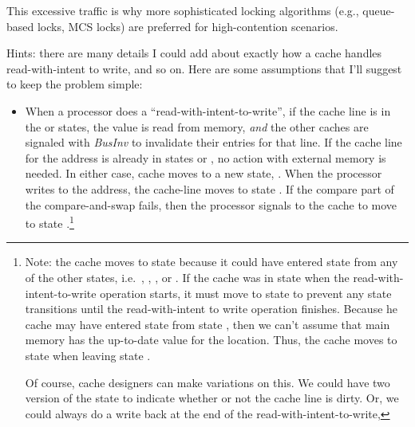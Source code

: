 \documentclass{article}
\newenvironment{answer}
{\color{blue}}
{\normalfont}
\begin{document}
\begin{enumerate}
\begin{enumerate}
\begin{answer}
                        This excessive traffic is why more sophisticated locking algorithms (e.g., queue-based locks, MCS locks) are preferred for high-contention scenarios.
                    \end{answer}
          \end{enumerate}
          Hints: there are many details I could add about exactly how a cache handles read-with-intent to write, and so on.
          Here are some assumptions that I'll suggest to keep the problem simple:
          \begin{itemize}
              \item When a processor does a ``read-with-intent-to-write'',
                    if the cache line is in the  or  states, the value is read from memory, \textit{and}
                    the other caches are signaled with \emph{BusInv} to invalidate their entries
                    for that line.
                    If the cache line for the address is already in states  or , no action with external memory
                    is needed.
                    In either case, cache moves to a new state, .
                    When the processor writes to the address, the cache-line moves to state .
                    If the compare part of the compare-and-swap fails,
                    then the processor signals to the cache to move to state
                    .\footnote{
                        Note: the cache moves to state  because it could have entered state
                         from any of the other states, i.e.\ , , , or
                        .  If the cache was in state  when the read-with-intent-to-write
                        operation starts, it must move to state  to prevent any state transitions
                        until the read-with-intent to write operation finishes.
                        Because he cache may have entered state  from state , then
                        we can't assume that main memory has the up-to-date value for the location.
                        Thus, the cache moves to state  when leaving state .
                        \par
                        Of course, cache designers can make variations on this.  We could have two
                        version of the  state to indicate whether or not the cache line is dirty.
                        Or, we could always do a write back at the end of the read-with-intent-to-write,
}
\end{itemize}
\end{enumerate}
\end{document}
